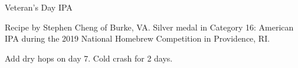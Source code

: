\begin{recipe}{Veteran's Day IPA}

\begin{aboutblock}
Recipe by Stephen Cheng of Burke, VA. Silver medal in Category 16: American
IPA during the 2019 National Homebrew Competition in Providence, RI.
\sourceaha
\end{aboutblock}


\begin{methodandtiming}
 
\begin{mashsteps}
\end{mashsteps}

\begin{fermentationsteps}
\end{fermentationsteps}

\begin{directions}
Add dry hops on day 7. Cold crash for 2 days.
\end{directions}

\end{methodandtiming}

\recipebreak

\begin{ingredientsblock}

\begin{malts}
\end{malts}

\begin{hops}
\end{hops}


\end{ingredientsblock}

\end{recipe}

